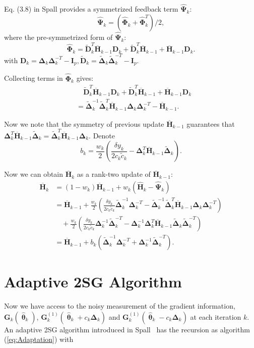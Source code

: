 \documentclass[conference,10.6cpt]{IEEEtran}
\newcommand{\bD}{\bm{D}}
\newcommand{\bG}{\bm{G}}
\newcommand{\bI}{\bm{I}}
\newcommand{\bDelta}{\bm{\Delta}}
\newcommand{\oH}{\bm{\overline{H}}}
\newcommand{\hH}{\bm{\hat{H}}}
\newcommand{\hPsi}{\bm{\hat{\Psi}}}
\newcommand{\htheta}{\bm{\hat{\uptheta}}}
\newcommand{\hPhi}{\bm{\hat{\Phi}}}
\newcommand{\tDelta}{\bm{\tilde{\Delta}}}
\newcommand{\tD}{\bm{\tilde{D}}}
\begin{document}
Eq. (3.8) in Spall \cite{Spall2009} provides a symmetrized feedback term $ \hPsi_k $:
\begin{equation} \label{eq:PsiHat}
\hPsi_k =(\hPhi_k+\hPhi_k^T)/2,
\end{equation}
where the pre-symmetrized form of $ \hPsi_k $:
\begin{equation}
\hPhi_k=\tD_k^T\oH_{k-1}\bD_k+\tD_k^T\oH_{k-1}+\oH_{k-1}\bD_k.
\end{equation}
with $ \bD_k=\bDelta_k\bDelta_k^{-T}-\bI_p, \tD_k=\tDelta_k\tDelta_k^{-T}-\bI_p $.

Collecting terms in $\hPhi_k$ gives:
\begin{align*}
&\quad\tD_k^T\oH_{k-1}\bD_k+\tD_k^T\oH_{k-1}+\oH_{k-1}\bD_k\\
&=\tDelta_k^{-1}\tDelta_k^{T}\oH_{k-1}\bDelta_k\bDelta_k^{-T}-\oH_{k-1}.
\end{align*}

Now we note that the symmetry of previous update $ \oH_{k-1}$ guarantees that
$\bDelta_k^{T}\oH_{k-1}\tDelta_k=\tDelta_k^{T}\oH_{k-1}\bDelta_k$. Denote
\begin{equation}
  b_k=\frac{w_k}{2}(\frac{\delta y_k}{2c_k\tilde{c}_k}-\bDelta_k^{T}\oH_{k-1}\tDelta_k).
\end{equation}

Now we can obtain $\oH_k$ as a rank-two update of $\oH_{k-1}$:
\begin{align*}
\oH_k&=(1-w_k)\oH_{k-1}+w_k(\hH_k-\hPsi_k)\\
     &=\oH_{k-1}+\frac{w_k}{2}(\frac{\delta y_k}{2c_k\tilde{c}_k}\tDelta_k^{-1}\bDelta_k^{-T}-\tDelta_k^{-1}\tDelta_k^{T}\oH_{k-1}\bDelta_k\bDelta_k^{-T})\\
     &\quad +\frac{w_k}{2}(\frac{\delta y_k}{2c_k\tilde{c}_k}\bDelta_k^{-1}\tDelta_k^{-T}-\bDelta_k^{-1}\bDelta_k^{T}\oH_{k-1}\tDelta_k\tDelta_k^{-T})\\
     &=\oH_{k-1}+b_k(\tDelta_k^{-1}\bDelta_k^{-T}+\bDelta_k^{-1}\tDelta_k^{-T}).
\end{align*}





\section{Adaptive 2SG Algorithm} \label{2SG}
Now we have
access to the noisy measurement of the gradient information,
$\bG_k(\htheta_k)$, $\bG_k^{(1)}(\htheta_k+ c_k\bDelta_k)$ and
$\bG_k^{(1)}(\htheta_k- c_k\bDelta_k)$ at each iteration $k$. An
adaptive 2SG algorithm introduced in Spall~\cite{Spall2000} has the
recursion as algorithm (\ref{eq:Adaptation}) with
\end{document}
